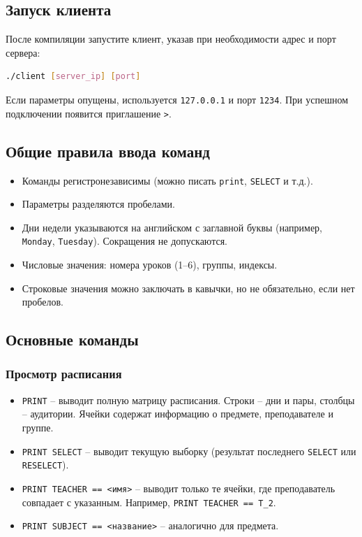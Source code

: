 \documentclass[12pt,a4paper]{article}
\begin{document}
\subsection{Запуск клиента}
После компиляции запустите клиент, указав при необходимости адрес и порт сервера:
\begin{lstlisting}[language=bash]
./client [server_ip] [port]
\end{lstlisting}
Если параметры опущены, используется \texttt{127.0.0.1} и порт \texttt{1234}. При успешном подключении появится приглашение \texttt{>}.

\subsection{Общие правила ввода команд}
\begin{itemize}
  \item Команды регистронезависимы (можно писать \texttt{print}, \texttt{SELECT} и т.д.).
  \item Параметры разделяются пробелами.
  \item Дни недели указываются на английском с заглавной буквы (например, \texttt{Monday}, \texttt{Tuesday}). Сокращения не допускаются.
  \item Числовые значения: номера уроков (1–6), группы, индексы.
  \item Строковые значения можно заключать в кавычки, но не обязательно, если нет пробелов.
\end{itemize}

\subsection{Основные команды}

\subsubsection{Просмотр расписания}
\begin{itemize}
  \item \texttt{PRINT} – выводит полную матрицу расписания. Строки – дни и пары, столбцы – аудитории. Ячейки содержат информацию о предмете, преподавателе и группе.
  \item \texttt{PRINT SELECT} – выводит текущую выборку (результат последнего \texttt{SELECT} или \texttt{RESELECT}).
  \item \texttt{PRINT TEACHER == <имя>} – выводит только те ячейки, где преподаватель совпадает с указанным. Например, \texttt{PRINT TEACHER == T\_2}.
  \item \texttt{PRINT SUBJECT == <название>} – аналогично для предмета.
\end{itemize}
\end{document}
